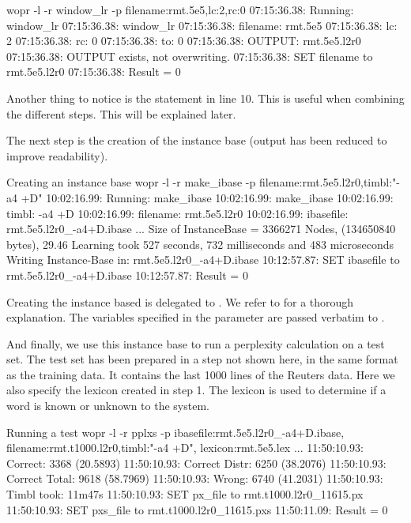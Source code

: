 \documentclass[a4paper,10pt,twoside]{report}
\begin{document}
\begin{bash}{}
wopr -l -r window_lr -p filename:rmt.5e5,lc:2,rc:0
07:15:36.38: Running: window_lr
07:15:36.38: window_lr
07:15:36.38:  filename:  rmt.5e5
07:15:36.38:  lc:        2
07:15:36.38:  rc:        0
07:15:36.38:  to:        0
07:15:36.38:  OUTPUT:    rmt.5e5.l2r0
07:15:36.38: OUTPUT exists, not overwriting.
07:15:36.38: SET filename to rmt.5e5.l2r0
07:15:36.38: Result = 0
\end{bash}

Another thing to notice is the  statement in line
\num{10}. This is useful when combining the different steps. This will
be explained later.

The next step is the creation of the instance base (output has been
reduced to improve readability).

\begin{bash}{Creating an instance base}
wopr -l -r make_ibase -p filename:rmt.5e5.l2r0,timbl:"-a4 +D"
10:02:16.99: Running: make_ibase
10:02:16.99: make_ibase
10:02:16.99:  timbl:     -a4 +D
10:02:16.99:  filename:  rmt.5e5.l2r0
10:02:16.99:  ibasefile: rmt.5e5.l2r0_-a4+D.ibase
...
Size of InstanceBase = 3366271 Nodes, (134650840 bytes), 29.46 %
Learning took 527 seconds, 732 milliseconds and 483 microseconds
Writing Instance-Base in: rmt.5e5.l2r0_-a4+D.ibase
10:12:57.87: SET ibasefile to rmt.5e5.l2r0_-a4+D.ibase
10:12:57.87: Result = 0
\end{bash}

Creating the instance based is delegated to \Timbl{}. We refer to
\cite{Daelemans+09} for a thorough explanation. The variables
specified in the  parameter are passed verbatim to \Timbl{}.


And finally, we use this instance base to run a perplexity calculation
on a test set. The test set has been prepared in a step not shown
here, in the same format as the training data. It contains the last
\num{1000} lines of the Reuters data. Here we also specify the lexicon
created in step \textsf{1}. The lexicon is used to determine if a word
is known or unknown to the system.

\begin{bash}{Running a test}
wopr -l -r pplxs -p ibasefile:rmt.5e5.l2r0_-a4+D.ibase,
                    filename:rmt.t1000.l2r0,timbl:"-a4 +D",
                    lexicon:rmt.5e5.lex
...
11:50:10.93:  Correct:       3368 (20.5893)
11:50:10.93:  Correct Distr: 6250 (38.2076)
11:50:10.93:  Correct Total: 9618 (58.7969)
11:50:10.93:  Wrong:         6740 (41.2031)
11:50:10.93:  Timbl took: 11m47s
11:50:10.93:  SET px_file to rmt.t1000.l2r0_11615.px
11:50:10.93:  SET pxs_file to rmt.t1000.l2r0_11615.pxs
11:50:11.09: Result = 0
\end{bash}
\end{document}
